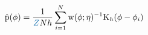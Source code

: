 \begin{equation*}
  \hat{\pd}(\phi) = 
  \frac{1}{\textcolor{mymidblue}{Z}Nh} 
    \sum\limits_{i=1}^{N} \w(\phi;\eta)^{-1} \text{K}_{h}(\phi - \phi_{i})
\end{equation*}